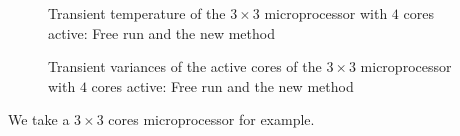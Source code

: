\begin{figure}
  \centering
 \caption{Transient temperature of the $3\times 3$ microprocessor with $4$ cores active: Free run and the new method}\label{t_b}
\end{figure}
\begin{figure}
\centering
\caption{Transient variances of the active cores of the $3\times 3$ microprocessor with $4$ cores active: Free run and the new method}\label{var}
\end{figure}
We take a $3\times 3$ cores microprocessor for example.

